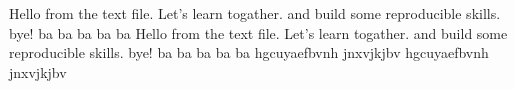 Hello from the text file. 
Let's learn togather.
and build some reproducible skills.
bye!
ba ba ba ba ba 
Hello from the text file. 
Let's learn togather.
and build some reproducible skills.
bye!
ba ba ba ba ba 
hgcuyaefbvnh jnxvjkjbv 
hgcuyaefbvnh jnxvjkjbv 
